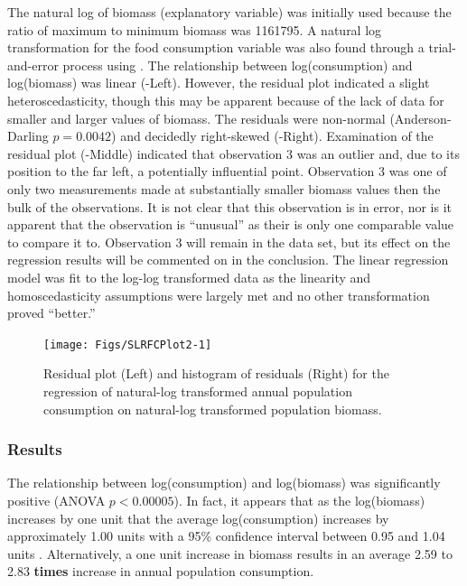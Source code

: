 \documentclass[10pt,openany]{book}\usepackage[]{graphicx}\usepackage[]{color}
\newenvironment{knitrout}{}{} %
\begin{document}
The natural log of biomass (explanatory variable) was initially used because the ratio of maximum to minimum biomass was 1161795.  A natural log transformation for the food consumption variable was also found through a trial-and-error process using .  The relationship between log(consumption) and log(biomass) was linear (-Left).  However, the residual plot indicated a slight heteroscedasticity, though this may be apparent because of the lack of data for smaller and larger values of biomass.  The residuals were non-normal (Anderson-Darling $p=0.0042$) and decidedly right-skewed (-Right).  Examination of the residual plot (-Middle) indicated that observation 3 was an outlier and, due to its position to the far left, a potentially influential point.  Observation 3 was one of only two measurements made at substantially smaller biomass values then the bulk of the observations.  It is not clear that this observation is in error, nor is it apparent that the observation is ``unusual'' as their is only one comparable value to compare it to.  Observation 3 will remain in the data set, but its effect on the regression results will be commented on in the conclusion.  The linear regression model was fit to the log-log transformed data as the linearity and homoscedasticity assumptions were largely met and no other transformation proved ``better.''

\begin{knitrout}
\color{fgcolor}\begin{figure}[h]

{\centering \texttt{[image: Figs/SLRFCPlot2-1]} 

}

\caption[Residual plot (Left) and histogram of residuals (Right) for the regression of natural-log transformed annual population consumption on natural-log transformed population biomass]{Residual plot (Left) and histogram of residuals (Right) for the regression of natural-log transformed annual population consumption on natural-log transformed population biomass.}\label{fig:SLRFCPlot2}
\end{figure}


\end{knitrout}

\subsubsection*{Results}
The relationship between log(consumption) and log(biomass) was significantly positive (ANOVA $p<0.00005$).  In fact, it appears that as the log(biomass) increases by one unit that the average log(consumption) increases by approximately 1.00  units with a 95\% confidence interval between 0.95 and 1.04 units .  Alternatively, a one unit increase in biomass results in an average 2.59 to 2.83 \textbf{times} increase in annual population consumption.
\end{document}

